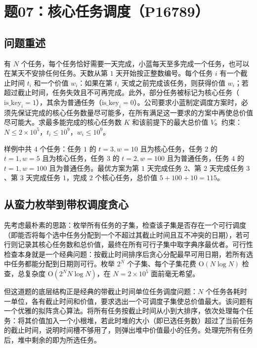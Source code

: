 \section{题07：核心任务调度（P16789）}

\subsection{问题重述}

有 $N$ 个任务，每个任务恰好需要一天完成，小蓝每天至多完成一个任务，也可以在某天不安排任何任务。天数从第 $1$ 天开始按正整数编号。每个任务 $i$ 有一个截止时间 $t_i$ 和一个价值 $w_i$：如果在第 $t_i$ 天或之前完成该任务，则获得价值 $w_i$；若超过截止时间，任务失效且不可再完成。此外，部分任务被标记为核心任务（$\text{is\_key}_i = 1$），其余为普通任务（$\text{is\_key}_i = 0$）。公司要求小蓝制定调度方案时，必须先保证完成的核心任务数量尽可能多，在所有满足这一要求的方案中再使总价值尽可能大。求最多能完成的核心任务数 $K$ 和该前提下的最大总价值 $V$。约束：$N \le 2 \times 10^5$，$t_i \le 10^9$，$w_i \le 10^9$。

样例中共 $4$ 个任务：任务 $1$ 的 $t=3, w=10$ 且为核心任务，任务 $2$ 的 $t=1, w=5$ 且为核心任务，任务 $3$ 的 $t=2, w=100$ 且为普通任务，任务 $4$ 的 $t=1, w=100$ 且为普通任务。最优方案为第 $1$ 天完成任务 $2$、第 $2$ 天完成任务 $3$、第 $3$ 天完成任务 $1$，完成 $2$ 个核心任务，总价值 $5+100+10=115$。

\subsection{从蛮力枚举到带权调度贪心}

先考虑最朴素的思路：枚举所有任务的子集，检查该子集是否存在一个可行调度（即能否将每个选中任务分配到一个不超过其截止时间且互不冲突的日期），若可行则记录其核心任务数和总价值，最终在所有可行子集中取字典序最优者。可行性检查本身就是一个经典问题：按截止时间排序后贪心分配最早可用日期，若所有选中任务都能分配到日期则可行。枚举 $2^N$ 个子集、每个子集花费 $\mathrm{O}(N \log N)$ 检查，总复杂度 $\mathrm{O}(2^N N \log N)$，在 $N = 2 \times 10^5$ 面前毫无希望。

但这道题的底层结构正是经典的带截止时间单位任务调度问题：$N$ 个任务各耗时一单位，各有截止时间和价值，要求选出一个可调度子集使总价值最大。该问题有一个优雅的拟阵贪心算法。将所有任务按截止时间从小到大排序，依次处理每个任务：将其价值加入一个小根堆，若此时堆的大小（即已选任务数）超过了当前任务的截止时间，说明时间槽不够用了，则弹出堆中价值最小的任务。处理完所有任务后，堆中剩余的即为所选任务。

